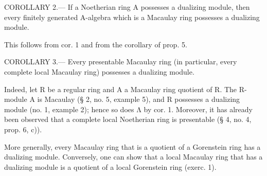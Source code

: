 COROLLARY 2.--- If a Noetherian ring A possesses a dualizing module, then every finitely generated A-algebra which is a Macaulay ring possesses a dualizing module.

This follows from cor. 1 and from the corollary of prop. 5.

COROLLARY 3.--- Every presentable Macaulay ring (in particular, every complete local Macaulay ring) possesses a dualizing module.

Indeed, let R be a regular ring and A a Macaulay ring quotient of R. The R-module A is Macaulay (§ 2, no. 5, example 5), and R possesses a dualizing module (no. 1, example 2); hence so does Λ by cor. 1. Moreover, it has already been observed that a complete local Noetherian ring is presentable (§ 4, no. 4, prop. 6, c)).

More generally, every Macaulay ring that is a quotient of a Gorenstein ring has a dualizing module. Conversely, one can show that a local Macaulay ring that has a dualizing module is a quotient of a local Gorenstein ring (exerc. 1).

